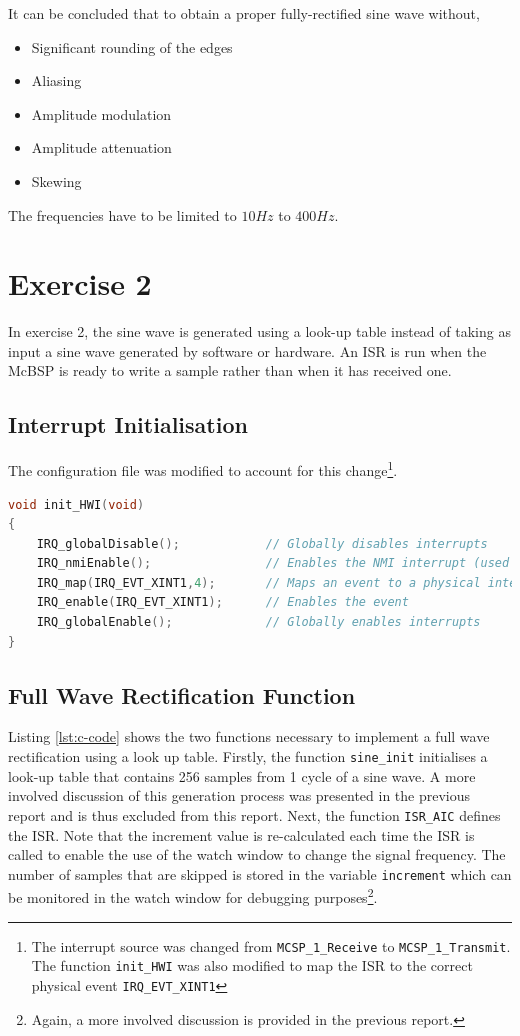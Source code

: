 \documentclass{article}
\begin{document}
It can be concluded that to obtain a proper fully-rectified sine wave without,
\begin{itemize}
    \item Significant rounding of the edges
    \item Aliasing
    \item Amplitude modulation
    \item Amplitude attenuation
    \item Skewing
\end{itemize}
The frequencies have to be limited to $10Hz$ to $400Hz$.

\newpage
\section{Exercise 2}

In exercise 2, the sine wave is generated using a look-up table instead of taking as input a sine wave generated by software or hardware. An ISR is run when the McBSP is ready to write a sample rather than when it has received one.

\subsection{Interrupt Initialisation}
The configuration file was modified to account for this change\footnote{The interrupt source was changed from {\tt MCSP\_1\_Receive} to {\tt MCSP\_1\_Transmit}. The function {\tt init\_HWI} was also modified to map the ISR to the correct physical event {\tt IRQ\_EVT\_XINT1}}.\\

\begin{lstlisting}[language=C, frame = single, caption=Interrupt initialisation for exercise 2]
void init_HWI(void)
{
	IRQ_globalDisable();            // Globally disables interrupts
	IRQ_nmiEnable();                // Enables the NMI interrupt (used by the debugger)
	IRQ_map(IRQ_EVT_XINT1,4);       // Maps an event to a physical interrupt
	IRQ_enable(IRQ_EVT_XINT1);      // Enables the event
	IRQ_globalEnable();             // Globally enables interrupts
} 
\end{lstlisting}

\subsection{Full Wave Rectification Function}
Listing \ref{lst:c-code} shows the two functions necessary to implement a full wave rectification using a look up table. Firstly, the function {\tt sine\_init} initialises a look-up table that contains 256 samples from 1 cycle of a sine wave. A more involved discussion of this generation process was presented in the previous report and is thus excluded from this report. Next, the function {\tt ISR\_AIC} defines the ISR. Note that the increment value is re-calculated each time the ISR is called to enable the use of the watch window to change the signal frequency. The number of samples that are skipped is stored in the variable {\tt increment} which can be monitored in the watch window for debugging purposes\footnote{Again, a more involved discussion is provided in the previous report.}.\\
\end{document}

